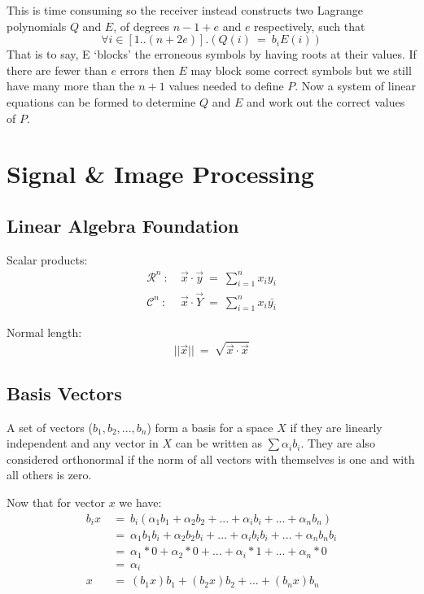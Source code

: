 \documentclass[a4paper]{article}
\begin{document}
This is time consuming so the receiver instead constructs two Lagrange polynomials $Q$ and $E$, of degrees $n - 1 + e$ and $e$ respectively, such that 
$$\forall i\in[1..(n+2e)].(Q(i)\ =\ b_i E(i))$$
That is to say, E `blocks' the erroneous symbols by having roots at their values. If there are fewer than $e$ errors then $E$ may block some correct symbols but we still have many more than the $n+1$ values needed to define $P$. Now a system of linear equations can be formed to determine $Q$ and $E$ and work out the correct values of $P$.


\section{Signal \& Image Processing}

\subsection{Linear Algebra Foundation}

Scalar products:
\begin{align*}
	\mathcal{R}^n\ :&\ \vec{x}\cdot\vec{y}\ =\ \sum\limits_{i=1}^n x_iy_i \\
	\mathcal{C}^n\ :&\ \vec{x}\cdot\vec{Y}\ =\ \sum\limits_{i=1}^n x_i\bar{y_i}
\end{align*}

Normal length:
$$||\vec{x}||\ =\ \sqrt{\vec{x}\cdot\vec{x}}$$

\subsection{Basis Vectors}
A set of vectors ($b_1, b_2, ..., b_n$) form a basis for a space $X$ if they are linearly independent and any vector in $X$ can be written as $\sum\alpha_ib_i$. They are also considered orthonormal if the norm of all vectors with themselves is one and with all others is zero.

Now that for vector $x$ we have:
\begin{align*}
	b_ix\ &=\ b_i(\alpha_1 b_1 + \alpha_2b_2 + ... + \alpha_ib_i + ... + \alpha_nb_n ) \\
	&=\ \alpha_1 b_1b_i + \alpha_2b_2b_i + ... + \alpha_ib_ib_i + ... + \alpha_nb_nb_i \\
	&=\ \alpha_1*0 + \alpha_2*0 + ... + \alpha_i * 1 + ... + \alpha_n*0 \\
	&=\ \alpha_i \\
	x\ &=\ (b_1x)b_1 + (b_2x)b_2 + ... + (b_nx)b_n
\end{align*}
\end{document}
